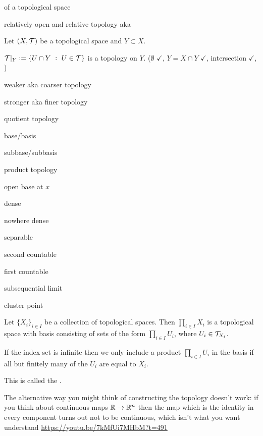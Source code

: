 \begin{definition}
   of a topological space

  relatively open and relative topology aka 

  Let $(X, \mathcal T)$ be a topological space and $Y \subset X$.

  $\mathcal T|_Y := \{ U \cap Y ~:~ U \in \mathcal T\}$ is a topology on $Y$.
  ($\emptyset$ $\checkmark$, $Y = X \cap Y$ $\checkmark$, intersection $\checkmark$, )



  weaker aka coarser topology

  stronger aka finer topology

  quotient topology

  base/basis

  subbase/subbasis

  product topology

  open base at $x$

  dense

  nowhere dense

  separable

  second countable

  first countable

  subsequential limit

  cluster point
\end{definition}


\begin{definition}[product]
  Let $\{X_i\}_{i \in I}$ be a collection of topological spaces. Then $\prod_{i \in I} X_i$ is a topological
  space with basis consisting of sets of the form $\prod_{i \in I} U_i$, where $U_i \in \mathcal T_{X_i}$.

  If the index set is infinite then we only include a product $\prod_{i \in I} U_i$ in the basis if
  all but finitely many of the $U_i$ are equal to $X_i$.

  This is called the .
\end{definition}

\begin{remark}
  The alternative way you might think of constructing the topology doesn't work: if you think about
  continuous maps $\mathbb{R} \to \mathbb{R}^n$ then the map which is the identity in every component turns out not
  to be continuous, which isn't what you want  understand \url{https://youtu.be/7kMfUi7MHbM?t=491}
\end{remark}

